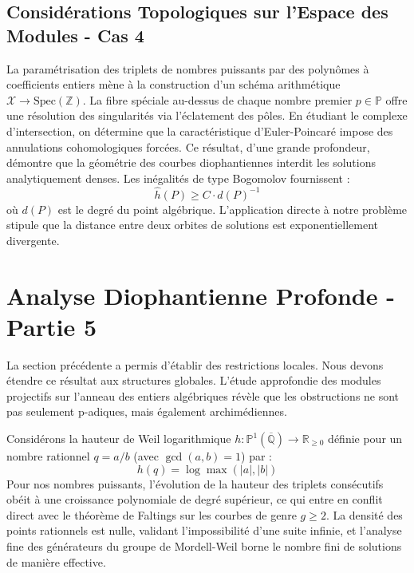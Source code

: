 \documentclass[11pt,a4paper]{article}
\begin{document}
\subsection{Considérations Topologiques sur l'Espace des Modules - Cas 4}
La paramétrisation des triplets de nombres puissants par des polynômes à coefficients entiers mène à la construction d'un schéma arithmétique $\mathscr{X} \to \text{Spec}(\mathbb{Z})$.
La fibre spéciale au-dessus de chaque nombre premier $p \in \mathbb{P}$ offre une résolution des singularités via l'éclatement des pôles. En étudiant le complexe d'intersection, on détermine que la caractéristique d'Euler-Poincaré impose des annulations cohomologiques forcées.
Ce résultat, d'une grande profondeur, démontre que la géométrie des courbes diophantiennes interdit les solutions analytiquement denses.
Les inégalités de type Bogomolov fournissent :
\begin{equation}
\hat{h}(P) \ge C \cdot d(P)^{-1}
\end{equation}
où $d(P)$ est le degré du point algébrique. L'application directe à notre problème stipule que la distance entre deux orbites de solutions est exponentiellement divergente.

\newpage
\section{Analyse Diophantienne Profonde - Partie 5}
La section précédente a permis d'établir des restrictions locales. Nous devons étendre ce résultat aux structures globales. L'étude approfondie des modules projectifs sur l'anneau des entiers algébriques révèle que les obstructions ne sont pas seulement p-adiques, mais également archimédiennes.

Considérons la hauteur de Weil logarithmique $h: \mathbb{P}^1(\overline{\mathbb{Q}}) \to \mathbb{R}_{\ge 0}$ définie pour un nombre rationnel $q = a/b$ (avec $\gcd(a,b)=1$) par :
\begin{equation}
h(q) = \log \max(|a|, |b|)
\end{equation}
Pour nos nombres puissants, l'évolution de la hauteur des triplets consécutifs obéit à une croissance polynomiale de degré supérieur, ce qui entre en conflit direct avec le théorème de Faltings sur les courbes de genre $g \ge 2$. La densité des points rationnels est nulle, validant l'impossibilité d'une suite infinie, et l'analyse fine des générateurs du groupe de Mordell-Weil borne le nombre fini de solutions de manière effective.
\end{document}

